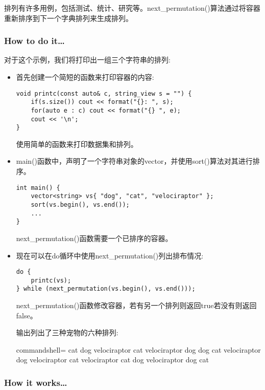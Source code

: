 
排列有许多用例，包括测试、统计、研究等。next\_permutation()算法通过将容器重新排序到下一个字典排列来生成排列。

\subsubsection{How to do it…}

对于这个示例，我们将打印出一组三个字符串的排列:

\begin{itemize}
\item 
首先创建一个简短的函数来打印容器的内容:

\begin{lstlisting}[style=styleCXX]
void printc(const auto& c, string_view s = "") {
	if(s.size()) cout << format("{}: ", s);
	for(auto e : c) cout << format("{} ", e);
	cout << '\n';
}
\end{lstlisting}

使用简单的函数来打印数据集和排列。

\item 
main()函数中，声明了一个字符串对象的vector，并使用sort()算法对其进行排序。

\begin{lstlisting}[style=styleCXX]
int main() {
	vector<string> vs{ "dog", "cat", "velociraptor" };
	sort(vs.begin(), vs.end());
	...
}
\end{lstlisting}

next\_permutation()函数需要一个已排序的容器。

\item 
现在可以在do循环中使用next\_permutation()列出排布情况:

\begin{lstlisting}[style=styleCXX]
do {
	printc(vs);
} while (next_permutation(vs.begin(), vs.end()));
\end{lstlisting}

next\_permutation()函数修改容器，若有另一个排列则返回true若没有则返回false。

输出列出了三种宠物的六种排列:

\begin{tcblisting}{commandshell={}}
cat dog velociraptor
cat velociraptor dog
dog cat velociraptor
dog velociraptor cat
velociraptor cat dog
velociraptor dog cat
\end{tcblisting}
\end{itemize}

\subsubsection{How it works…}

